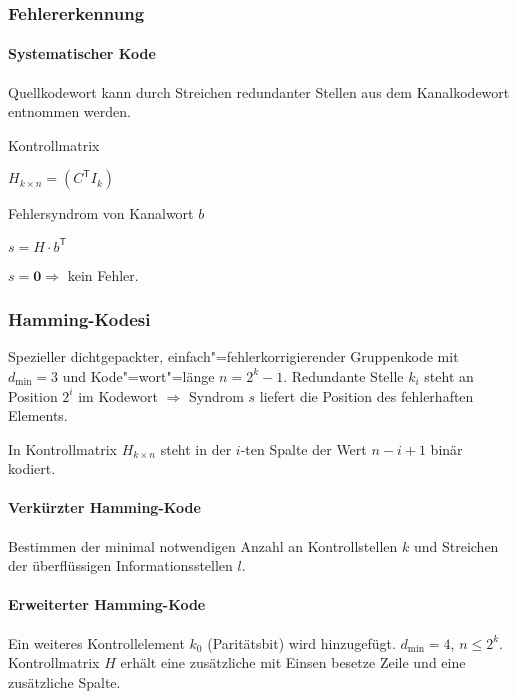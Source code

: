 \documentclass[8pt,a4paper,landscape]{extarticle}
\begin{document}
\begin{multicols*}{6}
\subsubsection{Fehlererkennung}
\paragraph{Systematischer Kode}
Quellkodewort kann durch Streichen redundanter Stellen aus dem Kanalkodewort entnommen werden.

Kontrollmatrix

$\boxed{H_{k \times n} = (C^{\mathsf{T}} I_k)}$

Fehlersyndrom von Kanalwort $b$

$\boxed{s = H \cdot b^{\mathsf{T}}}$

$s = \mathbf{0} \Rightarrow$ kein Fehler.

\subsubsection{Hamming-Kodesi}
Spezieller dichtgepackter, einfach"=fehlerkorrigierender Gruppenkode mit $d_\text{min} = 3$ und Kode"=wort"=länge $n = 2^k - 1$. Redundante Stelle $k_i$ steht an Position $2^i$ im Kodewort $\Rightarrow$ Syndrom $s$ liefert die Position des fehlerhaften Elements.

In Kontrollmatrix $H_{k \times n}$ steht in der $i$-ten Spalte der Wert $n-i + 1$ binär kodiert.

\paragraph{Verkürzter Hamming-Kode}
Bestimmen der minimal notwendigen Anzahl an Kontrollstellen $k$ und Streichen der überflüssigen Informationsstellen $l$.

\paragraph{Erweiterter Hamming-Kode}
Ein weiteres Kontrollelement $k_0$ (Paritätsbit) wird hinzugefügt. $d_\text{min} = 4$, $n \le 2^k$. Kontrollmatrix $H$ erhält eine zusätzliche mit Einsen besetze Zeile und eine zusätzliche Spalte.


\end{multicols*}
\end{document}
